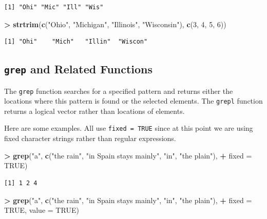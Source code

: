 \documentclass[]{krantz}
\makeatletter
\newenvironment{Shaded}{\begin{snugshade}}{\end{snugshade}}
\newcommand{\KeywordTok}[1]{\textcolor[rgb]{0.27,0.27,0.27}{\textbf{#1}}}
\newcommand{\DataTypeTok}[1]{\textcolor[rgb]{0.27,0.27,0.27}{#1}}
\newcommand{\DecValTok}[1]{\textcolor[rgb]{0.06,0.06,0.06}{#1}}
\newcommand{\StringTok}[1]{\textcolor[rgb]{0.5,0.5,0.5}{#1}}
\newcommand{\OtherTok}[1]{\textcolor[rgb]{0.37,0.37,0.37}{#1}}
\newcommand{\OperatorTok}[1]{\textcolor[rgb]{0.43,0.43,0.43}{\textbf{#1}}}
\newcommand{\NormalTok}[1]{#1}
\newenvironment{kframe}{%
\medskip{}
\setlength{\fboxsep}{.8em}
 \def\at@end@of@kframe{}%
 \ifinner\ifhmode%
  \def\at@end@of@kframe{\end{minipage}}%
  \begin{minipage}{\columnwidth}%
 \fi\fi%
 \def\FrameCommand##1{\hskip\@totalleftmargin \hskip-\fboxsep
 \colorbox{shadecolor}{##1}\hskip-\fboxsep
     \hskip-\linewidth \hskip-\@totalleftmargin \hskip\columnwidth}%
 \MakeFramed {\advance\hsize-\width
   \@totalleftmargin\z@ \linewidth\hsize
   \@setminipage}}%
 {\par\unskip\endMakeFramed%
 \at@end@of@kframe}
\renewenvironment{Shaded}{\begin{kframe}}{\end{kframe}}
\makeatother
\begin{document}
\begin{verbatim}
[1] "Ohi" "Mic" "Ill" "Wis"
\end{verbatim}

\begin{Shaded}
\begin{Highlighting}[]
\OperatorTok{>}\StringTok{ }\KeywordTok{strtrim}\NormalTok{(}\KeywordTok{c}\NormalTok{(}\StringTok{"Ohio"}\NormalTok{, }\StringTok{"Michigan"}\NormalTok{, }\StringTok{"Illinois"}\NormalTok{, }\StringTok{"Wisconsin"}\NormalTok{), }\KeywordTok{c}\NormalTok{(}\DecValTok{3}\NormalTok{, }\DecValTok{4}\NormalTok{, }\DecValTok{5}\NormalTok{, }\DecValTok{6}\NormalTok{))}
\end{Highlighting}
\end{Shaded}

\begin{verbatim}
[1] "Ohi"    "Mich"   "Illin"  "Wiscon"
\end{verbatim}

\subsection{\texorpdfstring{\texttt{grep} and Related
Functions}{grep and Related Functions}}\label{grep-and-related-functions}

The \texttt{grep} function searches for a specified pattern and returns
either the locations where this pattern is found or the selected
elements. The \texttt{grepl} function returns a logical vector rather
than locations of elements.

Here are some examples. All use \texttt{fixed\ =\ TRUE} since at this
point we are using fixed character strings rather than regular
expressions.

\begin{Shaded}
\begin{Highlighting}[]
\OperatorTok{>}\StringTok{ }\KeywordTok{grep}\NormalTok{(}\StringTok{"a"}\NormalTok{, }\KeywordTok{c}\NormalTok{(}\StringTok{"the rain"}\NormalTok{, }\StringTok{"in Spain    stays mainly"}\NormalTok{, }\StringTok{"in"}\NormalTok{, }\StringTok{"the plain"}\NormalTok{), }
\OperatorTok{+}\StringTok{      }\DataTypeTok{fixed =} \OtherTok{TRUE}\NormalTok{)}
\end{Highlighting}
\end{Shaded}

\begin{verbatim}
[1] 1 2 4
\end{verbatim}

\begin{Shaded}
\begin{Highlighting}[]
\OperatorTok{>}\StringTok{ }\KeywordTok{grep}\NormalTok{(}\StringTok{"a"}\NormalTok{, }\KeywordTok{c}\NormalTok{(}\StringTok{"the rain"}\NormalTok{, }\StringTok{"in Spain    stays mainly"}\NormalTok{, }\StringTok{"in"}\NormalTok{, }\StringTok{"the plain"}\NormalTok{), }
\OperatorTok{+}\StringTok{      }\DataTypeTok{fixed =} \OtherTok{TRUE}\NormalTok{, }\DataTypeTok{value =} \OtherTok{TRUE}\NormalTok{)}
\end{Highlighting}
\end{Shaded}
\end{document}
